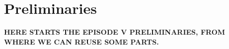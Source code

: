 
\section{Preliminaries}

{\bf HERE STARTS THE EPISODE V PRELIMINARIES, FROM WHERE WE CAN REUSE SOME PARTS.}

